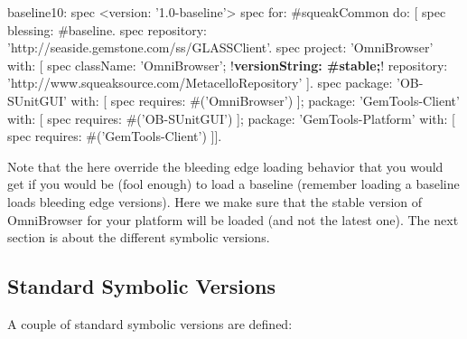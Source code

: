\documentclass[a4paper,10pt,twoside]{book}
\begin{document}
\begin{code}{}
baseline10: spec
     <version: '1.0-baseline'>
     spec for: #squeakCommon do: [
          spec blessing: #baseline.
          spec repository: 'http://seaside.gemstone.com/ss/GLASSClient'.
     spec
          project: 'OmniBrowser' with: [
          spec
               className: 'OmniBrowser';
               !\textbf{versionString: \#stable;}!
               repository: 'http://www.squeaksource.com/MetacelloRepository' ].
     spec
         package: 'OB-SUnitGUI' with: [
               spec requires: #('OmniBrowser') ];
         package: 'GemTools-Client' with: [
               spec requires: #('OB-SUnitGUI') ];
         package: 'GemTools-Platform' with: [
               spec requires: #('GemTools-Client') ]].
\end{code}

Note that the  here override the bleeding edge loading behavior that you would get if you would be (fool enough) to load a baseline (remember loading a baseline loads bleeding edge versions). Here we make sure that the stable version of OmniBrowser for your platform will be loaded (and not the latest one). The next section is about the different symbolic versions.
    
   
    


\subsection{Standard Symbolic Versions}

A couple of standard symbolic versions are defined:
\end{document}
